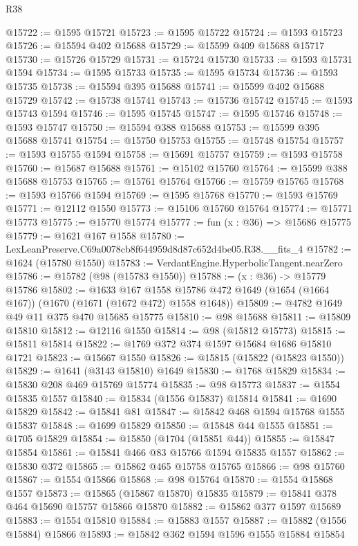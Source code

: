 \begin{lexlean}{R38}
\begin{coremodule}
@15722 := @1595 @15721
@15723 := @1595 @15722
@15724 := @1593 @15723
@15726 := @15594 @402 @15688
@15729 := @15599 @409 @15688 @15717
@15730 := @15726 @15729
@15731 := @15724 @15730
@15733 := @1593 @15731 @1594
@15734 := @1595 @15733
@15735 := @1595 @15734
@15736 := @1593 @15735
@15738 := @15594 @395 @15688
@15741 := @15599 @402 @15688 @15729
@15742 := @15738 @15741
@15743 := @15736 @15742
@15745 := @1593 @15743 @1594
@15746 := @1595 @15745
@15747 := @1595 @15746
@15748 := @1593 @15747
@15750 := @15594 @388 @15688
@15753 := @15599 @395 @15688 @15741
@15754 := @15750 @15753
@15755 := @15748 @15754
@15757 := @1593 @15755 @1594
@15758 := @15691 @15757
@15759 := @1593 @15758
@15760 := @15687 @15688
@15761 := @15102 @15760
@15764 := @15599 @388 @15688 @15753
@15765 := @15761 @15764
@15766 := @15759 @15765
@15768 := @1593 @15766 @1594
@15769 := @1595 @15768
@15770 := @1593 @15769
@15771 := @12112 @1550
@15773 := @15106 @15760 @15764
@15774 := @15771 @15773
@15775 := @15770 @15774
@15777 := fun (x : @36) => @15686 @15775
@15779 := @1621 @167 @1558
@15780 := LexLeanPreserve.C69a0078cb8f644959d8d87c652d4be05.R38.__fits_4
@15782 := @1624 (@15780 @1550)
@15783 := VerdantEngine.HyperbolicTangent.nearZero
@15786 := @15782 (@98 (@15783 @1550))
@15788 := (x : @36) -> @15779 @15786
@15802 := @1633
    @167
    @1558
    @15786
    @472
    @1649
    (@1654 (@1664 @167))
    (@1670 (@1671 (@1672 @472) @1558 @1648))
@15809 := @4782 @1649 @49 @11 @375 @470 @15685 @15775
@15810 := @98 @15688
@15811 := @15809 @15810
@15812 := @12116 @1550
@15814 := @98 (@15812 @15773)
@15815 := @15811 @15814
@15822 := @1769 @372 @374 @1597 @15684 @1686 @15810 @1721
@15823 := @15667 @1550
@15826 := @15815 (@15822 (@15823 @1550))
@15829 := @1641 (@3143 @15810) @1649
@15830 := @1768 @15829
@15834 := @15830 @208 @469 @15769 @15774
@15835 := @98 @15773
@15837 := @1554 @15835 @1557
@15840 := @15834 (@1556 @15837) @15814
@15841 := @1690 @15829
@15842 := @15841 @81
@15847 := @15842 @468 @1594 @15768 @1555 @15837
@15848 := @1699 @15829
@15850 := @15848 @44 @1555
@15851 := @1705 @15829
@15854 := @15850 (@1704 (@15851 @44))
@15855 := @15847 @15854
@15861 := @15841 @466 @83 @15766 @1594 @15835 @1557
@15862 := @15830 @372
@15865 := @15862 @465 @15758 @15765
@15866 := @98 @15760
@15867 := @1554 @15866
@15868 := @98 @15764
@15870 := @1554 @15868 @1557
@15873 := @15865 (@15867 @15870) @15835
@15879 := @15841 @378 @464 @15690 @15757 @15866 @15870
@15882 := @15862 @377 @1597 @15689
@15883 := @1554 @15810
@15884 := @15883 @1557
@15887 := @15882 (@1556 @15884) @15866
@15893 := @15842 @362 @1594 @1596 @1555 @15884 @15854

\end{coremodule}
\end{lexlean}
